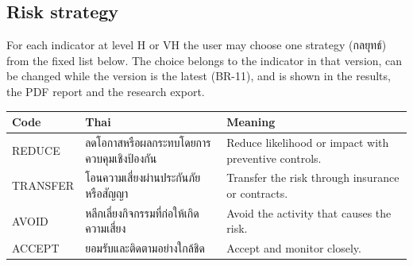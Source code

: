 \documentclass[11pt,a4paper]{article}
\newcommand{\thai}[1]{{\thaifont #1}}
\begin{document}
\subsection*{Risk strategy}
\begin{description}[style=nextline,leftmargin=1.6cm,labelwidth=1.4cm,font=\bfseries\color{creBlue}]
\item[BR-19] For each indicator at level H or VH the user may choose one strategy (\thai{กลยุทธ์}) from the fixed list below. The choice belongs to the indicator in that version, can be changed while the version is the latest (BR-11), and is shown in the results, the PDF report and the research export.
\end{description}
\begin{tabularx}{\linewidth}{@{}l l Y@{}}
\toprule
{}Code & Thai & Meaning \\
\midrule
REDUCE & \thai{ลดโอกาสหรือผลกระทบโดยการควบคุมเชิงป้องกัน} & Reduce likelihood or impact with preventive controls. \\
TRANSFER & \thai{โอนความเสี่ยงผ่านประกันภัยหรือสัญญา} & Transfer the risk through insurance or contracts. \\
AVOID & \thai{หลีกเลี่ยงกิจกรรมที่ก่อให้เกิดความเสี่ยง} & Avoid the activity that causes the risk. \\
ACCEPT & \thai{ยอมรับและติดตามอย่างใกล้ชิด} & Accept and monitor closely. \\
\bottomrule
\end{tabularx}
\end{document}
